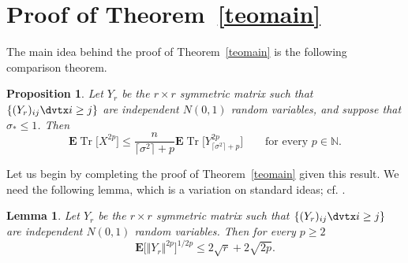 \documentclass[aop,MSNbibl,dvips]{arximspdf}
\newcommand{\rrVert}{\Vert}
\newcommand{\llVert}{\Vert}
\newtheorem{lem}[teo]{Lemma}
\newtheorem{prop}[teo]{Proposition}
\newcommand{\EE}{\mathbf{E}}
\newcommand{\Tr}{\operatorname{Tr}}
\begin{document}
\section{Proof of Theorem~\texorpdfstring{\protect\ref{teomain}}{1.1}}\label{secmain}

The main idea behind the proof of Theorem~\ref{teomain} is the
following comparison theorem.

%
\begin{prop}
\label{propmaincomp}
Let $Y_r$ be the $r\times r$ symmetric matrix such that\break
$\{(Y_r)_{ij}\dvtx i\ge j\}$ are independent $N(0,1)$ random variables, and
suppose that $\sigma_*\le1$. Then
%
\[
\EE\Tr\bigl[X^{2p}\bigr] \le\frac{n}{\lceil\sigma^2\rceil+p} \EE\Tr
\bigl[Y^{2p}_{\lceil\sigma^2\rceil+p} \bigr] \qquad\mbox{for every }p\in
\mathbb{N}.
%
\]
%
\end{prop}

Let us begin by completing the proof of Theorem~\ref{teomain}
given this result. We need the following lemma, which is a variation
on standard ideas; cf. \cite{DS01}.

%
\begin{lem}
\label{lemgordon}
Let $Y_r$ be the $r\times r$ symmetric matrix such that
$\{(Y_r)_{ij}\dvtx i\ge j\}$ are independent $N(0,1)$ random variables. Then
for every $p\ge2$
%
\[
\EE\bigl[\llVert Y_r\rrVert^{2p}\bigr]^{1/2p} \le
2\sqrt{r} + 2\sqrt{2p}. %
\]
%
\end{lem}
\end{document}
